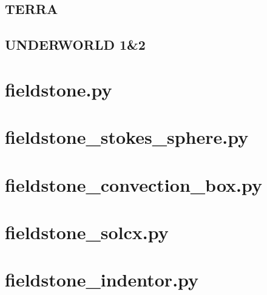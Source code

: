 \documentclass[a4paper]{article}
\begin{document}
\subsection{TERRA}

\subsection{UNDERWORLD 1\&2}




\newpage
\section{fieldstone.py}
%

\newpage
\section{fieldstone\_stokes\_sphere.py}
%

\section{fieldstone\_convection\_box.py}
%

\newpage
\section{fieldstone\_solcx.py}


\newpage
\section{fieldstone\_indentor.py}




\newpage


\end{document}
